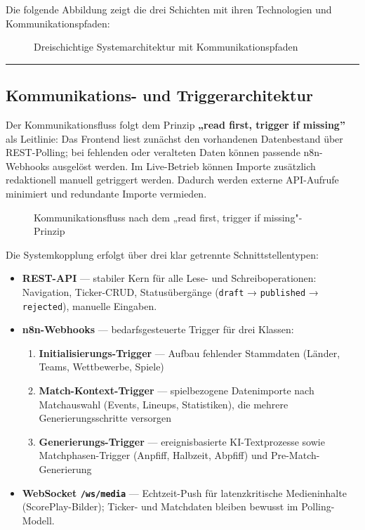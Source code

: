 Die folgende Abbildung zeigt die drei Schichten mit ihren Technologien
und Kommunikationspfaden:

\begin{figure}[H]
\centering
\DiagramSystemArchitektur
\caption{Dreischichtige Systemarchitektur mit Kommunikationspfaden}
\label{fig:systemarchitektur}
\end{figure}

\begin{center}\rule{0.5\linewidth}{0.5pt}\end{center}

\subsection{Kommunikations- und
Triggerarchitektur}\label{kommunikations--und-triggerarchitektur}

Der Kommunikationsfluss folgt dem Prinzip \textbf{„read first, trigger
if missing''} als Leitlinie: Das Frontend liest zunächst den
vorhandenen Datenbestand über REST-Polling; bei fehlenden oder
veralteten Daten können passende n8n-Webhooks ausgelöst werden. Im
Live-Betrieb können Importe zusätzlich redaktionell manuell getriggert
werden. Dadurch werden externe API-Aufrufe minimiert und redundante
Importe vermieden.

\begin{figure}[H]
\centering
\DiagramCommunicationFlow
\caption{Kommunikationsfluss nach dem „read first, trigger if missing"-Prinzip}
\label{fig:communicationflow}
\end{figure}

Die Systemkopplung erfolgt über drei klar getrennte Schnittstellentypen:

\begin{itemize}
\tightlist
\item
  \textbf{REST-API} --- stabiler Kern für alle Lese- und
  Schreiboperationen: Navigation, Ticker-CRUD, Statusübergänge
  (\texttt{draft} → \texttt{published} → \texttt{rejected}), manuelle
  Eingaben.
\item
  \textbf{n8n-Webhooks} --- bedarfsgesteuerte Trigger für drei Klassen:

  \begin{enumerate}
  \def\labelenumi{\arabic{enumi}.}
  \tightlist
  \item
    \textbf{Initialisierungs-Trigger} --- Aufbau fehlender Stammdaten
    (Länder, Teams, Wettbewerbe, Spiele)
  \item
    \textbf{Match-Kontext-Trigger} --- spielbezogene Datenimporte nach
    Matchauswahl (Events, Lineups, Statistiken), die mehrere
    Generierungsschritte versorgen
  \item
    \textbf{Generierungs-Trigger} --- ereignisbasierte KI-Textprozesse
    sowie Matchphasen-Trigger (Anpfiff, Halbzeit, Abpfiff) und
    Pre-Match-Generierung
  \end{enumerate}
\item
  \textbf{WebSocket \texttt{/ws/media}} --- Echtzeit-Push für
  latenzkritische Medieninhalte (ScorePlay-Bilder); Ticker- und
  Matchdaten bleiben bewusst im Polling-Modell.
\end{itemize}

